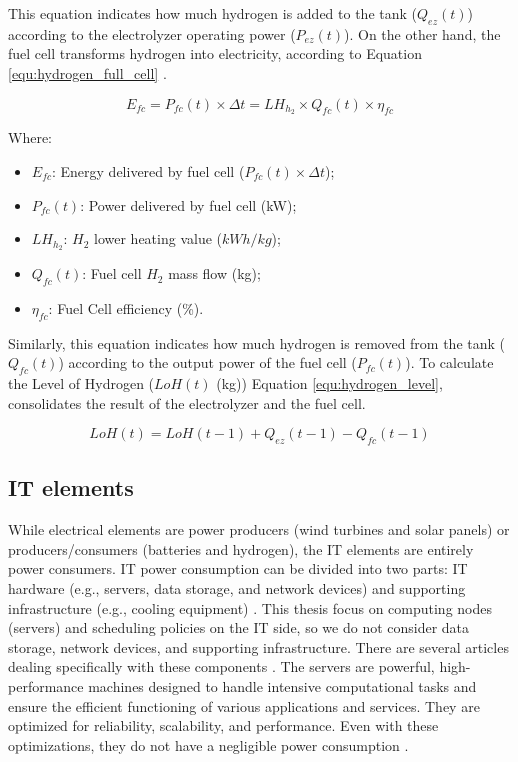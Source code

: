 This equation indicates how much hydrogen is added to the tank ($Q_{ez}(t)$) according to the electrolyzer operating power ($P_{ez}(t)$). On the other hand, the fuel cell transforms hydrogen into electricity, according to Equation \ref{equ:hydrogen_full_cell} \cite{haddad2019mixed}.

\begin{equation}
    \label{equ:hydrogen_full_cell}
    E_{fc} = P_{fc}(t) \times \Delta t = LH_{h_{2}} \times Q_{fc}(t) \times \eta_{fc}
\end{equation}

Where:
\begin{itemize}
    \item $E_{fc}$: Energy delivered by fuel cell ($P_{fc}(t) \times \Delta t$);
    \item $P_{fc}(t)$: Power delivered by fuel cell (kW);
    \item $LH_{h_{2}}$: $H_2$ lower heating value ($kWh / kg$);
    \item $Q_{fc}(t)$: Fuel cell $H_2$ mass flow (kg);
    \item $\eta_{fc}$: Fuel Cell efficiency (\%).
\end{itemize}

Similarly, this equation indicates how much hydrogen is removed from the tank ($Q_{fc}(t)$) according to the output power of the fuel cell ($P_{fc}(t)$). To calculate the Level of Hydrogen ($LoH(t)$ (kg)) Equation \ref{equ:hydrogen_level}, consolidates the result of the electrolyzer and the fuel cell.

\begin{equation}
    \label{equ:hydrogen_level}
    LoH(t) = LoH(t-1) + Q_{ez}(t-1) - Q_{fc}(t-1)
\end{equation}

\subsection{IT elements}
\label{sec:related_work_it_elements}
While electrical elements are power producers (wind turbines and solar panels) or producers/consumers (batteries and hydrogen), the IT elements are entirely power consumers. IT power consumption can be divided into two parts: IT hardware (e.g., servers, data storage, and network devices) and supporting infrastructure (e.g., cooling equipment) \cite{centres2022data, dayarathna2015data}. This thesis focus on computing nodes (servers) and scheduling policies on the IT side, so we do not consider data storage, network devices, and supporting infrastructure. There are several articles dealing specifically with these components \cite{dayarathna2015data, orgerie2014survey, zhang2021survey, hammadi2014survey, yuan2022optimal}. The servers are powerful, high-performance machines designed to handle intensive computational tasks and ensure the efficient functioning of various applications and services. They are optimized for reliability, scalability, and performance. Even with these optimizations, they do not have a negligible power consumption \cite{ismail2020computing, orgerie2014survey}.

